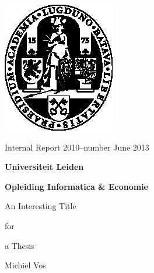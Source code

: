 \documentclass[12pt]{article}
\begin{document}
\thispagestyle{empty}

\begin{large}

\vspace*{4mm}\hspace*{-13mm}\includegraphics{ullogo.eps}

\vspace*{-3.5cm}

\sf 

\hspace*{2.5cm}Internal Report 2010--number \hfill June 2013

\vspace*{5mm}

\begin{Huge}
\hspace*{2.5cm}\textbf{Universiteit Leiden}

\vspace*{8mm}

\hspace*{2.5cm}\textbf{Opleiding Informatica \& Economie}
\end{Huge}

\vspace*{4.5cm}

\begin{Large}
\hfill An Interesting Title

\vspace*{3mm}

\hfill for

\vspace*{3mm}

\hfill a Thesis

\vspace*{4cm}

\hfill Michiel Vos

\end{Large}


\end{large}
\end{document}
